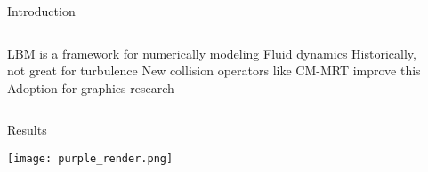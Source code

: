 \placelogofalse
\begin{frame}{Introduction}
\begin{columns}
\centering
\begin{outline}
  \1 LBM is a framework for numerically modeling Fluid dynamics
  \1 Historically, not great for turbulence
  \1 New collision operators like CM-MRT improve this
  \1 Adoption for graphics research \cite{Li2020, Li2024, Lyu2021}
\end{outline}

\begin{center}
\centering
{}

\end{center}
\end{columns}
\end{frame}
\placelogotrue

\placelogofalse
\begin{frame}{Results}
  \begin{center}
  \centering
  \texttt{[image: purple\_render.png]}
  \end{center}
\end{frame}
\placelogotrue
